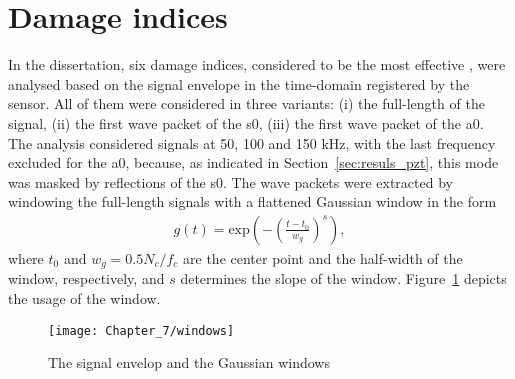 \section{Damage indices}
\label{sec:di}

In the dissertation, six damage indices, considered to be the most effective \cite{torkamani2014novel, moix2016damage}, were analysed based on the signal envelope in the time-domain registered by the sensor.
All of them were considered in three variants: (i) the full-length of the signal, (ii) the first wave packet of the \ac{s0}, (iii) the first wave packet of the \ac{a0}.
The analysis considered signals at 50, 100 and 150 \unit{\kHz}, with the last frequency excluded for the \ac{a0}, because, as indicated in Section~\ref{sec:resuls_pzt}, this mode was masked by reflections of the \ac{s0}.
The wave packets were extracted by windowing the full-length signals with a flattened Gaussian window in the form
\begin{eqnarray}
	g(t)= \mathrm{exp}\left(-\left(\frac{t-t_0}{w_g}\right) ^{s}\right),
	\label{eq:psi_g}
\end{eqnarray}
%
where \(t_0\) and \(w_g=0.5N_c/f_c\) are the center point and the half-width of the window, respectively, and \(s\) determines the slope of the window. Figure~\ref{fig:windows} depicts the usage of the window.
\begin{figure}[!tbh]
	\begin{center}
		\texttt{[image: Chapter\_7/windows]}
	\end{center}
	\caption{The signal envelop and the Gaussian windows}
	\label{fig:windows}
\end{figure}
\pagebreak


